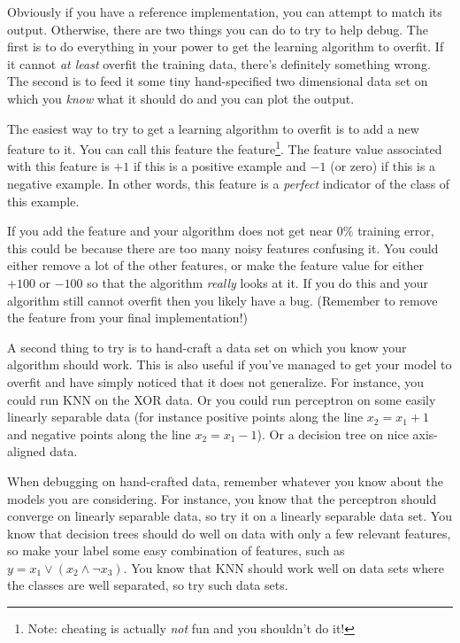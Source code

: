 Obviously if you have a reference implementation, you can attempt to
match its output.  Otherwise, there are two things you can do to try
to help debug.  The first is to do everything in your power to get the
learning algorithm to overfit.  If it cannot \emph{at least} overfit
the training data, there's definitely something wrong.  The second is
to feed it some tiny hand-specified two dimensional data set on which
you \emph{know} what it should do and you can plot the output.

The easiest way to try to get a learning algorithm to overfit is to
add a new feature to it.  You can call this feature the
 feature\footnote{Note: cheating is actually
  \emph{not} fun and you shouldn't do it!}.  The feature value
associated with this feature is $+1$ if this is a positive example and
$-1$ (or zero) if this is a negative example.  In other words, this
feature is a \emph{perfect} indicator of the class of this example.

If you add the  feature and your algorithm does
not get near $0\%$ training error, this could be because there are too
many noisy features confusing it.  You could either remove a lot of
the other features, or make the feature value for 
either $+100$ or $-100$ so that the algorithm \emph{really} looks at
it.  If you do this and your algorithm still cannot overfit then you
likely have a bug.  (Remember to remove the 
feature from your final implementation!)

A second thing to try is to hand-craft a data set on which you know
your algorithm should work.  This is also useful if you've managed to
get your model to overfit and have simply noticed that it does not
generalize.  For instance, you could run KNN on the XOR data.  Or you
could run perceptron on some easily linearly separable data (for
instance positive points along the line $x_2 = x_1 + 1$ and negative
points along the line $x_2 = x_1 - 1$).  Or a decision tree on nice
axis-aligned data.

When debugging on hand-crafted data, remember whatever you know about
the models you are considering.  For instance, you know that the
perceptron should converge on linearly separable data, so try it on a
linearly separable data set.  You know that decision trees should do
well on data with only a few relevant features, so make your label
some easy combination of features, such as $y = x_1 \lor (x_2 \land
\lnot x_3)$.  You know that KNN should work well on data sets where
the classes are well separated, so try such data sets.


